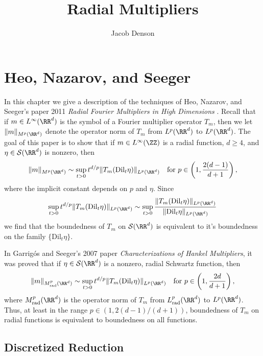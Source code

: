 

\title{Radial Multipliers}
\author{Jacob Denson}



\maketitle

\tableofcontents

\newpage

\chapter{Heo, Nazarov, and Seeger}

In this chapter we give a description of the techniques of Heo, Nazarov, and Seeger's paper 2011 \emph{Radial Fourier Multipliers in High Dimensions} \cite{HeoNazrovSeeger2011}. Recall that if $m \in L^\infty(\RR^d)$ is the symbol of a Fourier multiplier operator $T_m$, then we let $\| m \|_{M^p(\RR^d)}$ denote the operator norm of $T_m$ from $L^p(\RR^d)$ to $L^p(\RR^d)$. The goal of this paper is to show that if $m \in L^\infty(\ZZ)$ is a radial function, $d \geq 4$, and $\eta \in \mathcal{S}(\RR^d)$ is nonzero, then
%
\[ \| m \|_{M^p(\RR^d)} \sim \sup_{t > 0} t^{d/p} \| T_m(\text{Dil}_t \eta) \|_{L^p(\RR^d)} \quad \text{for}\ p \in \left(1, \frac{2(d-1)}{d+1} \right), \]
%
where the implicit constant depends on $p$ and $\eta$. Since
%
\[ \sup_{t > 0} t^{d/p} \| T_m(\text{Dil}_t \eta) \|_{L^p(\RR^d)} \sim \sup_{t > 0} \frac{\| T_m(\text{Dil}_t \eta) \|_{L^p(\RR^d)}}{\| \text{Dil}_t \eta \|_{L^p(\RR^d)}} \]
%
we find that the boundedness of $T_m$ on $\mathcal{S}(\RR^d)$ is equivalent to it's boundedness on the family $\{ \text{Dil}_t \eta \}$.

In Garrig\'{o}s and Seeger's 2007 paper \emph{Characterizations of Hankel Multipliers}, it was proved that if $\eta \in \mathcal{S}(\RR^d)$ is a nonzero, radial Schwartz function, then
%
\[ \| m \|_{M^p_{\text{rad}}(\RR^d)} \sim \sup_{t > 0} t^{d/p}  \| T_m(\text{Dil}_t \eta) \|_{L^p(\RR^d)}\quad\text{for}\ p \in \left( 1, \frac{2d}{d+1} \right), \]
%
where $M^p_{\text{rad}}(\RR^d)$ is the operator norm of $T_m$ from $L^p_{\text{rad}}(\RR^d)$ to $L^p(\RR^d)$. Thus, at least in the range $p \in (1,2(d-1)/(d+1))$, boundedness of $T_m$ on radial functions is equivalent to boundedness on all functions.

\section{Discretized Reduction}

